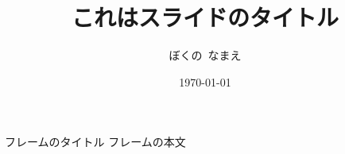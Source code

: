 \documentclass[
  xetex, %
  unicode,
  10pt %
]{beamer}
\title{これはスライドのタイトル}
\author{ぼくの\ なまえ}
\institute{上田研究室 4 ねん}
\date{\today}
\begin{document}
\maketitle

\begin{frame}{フレームのタイトル}
フレームの本文
\end{frame}
\end{document}
